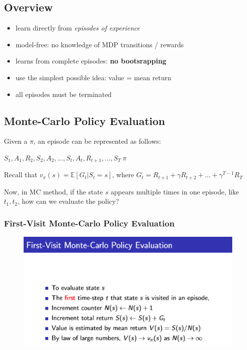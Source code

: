 \documentclass[12pt, a4paper]{paper}
\newcommand{\policy}[0]{$\pi$}
\newcommand{\statevalfunction}[0]{$v_{\pi}(s) = \mathbb{E} [G_{t} | S_{t} = s]$}
\newcommand{\statereturn}[0]{$G_{t} = R_{t+1} + \gamma R_{t+2} +...+ \gamma^{T-1} R_{T}$}
\begin{document}
\subsection{Overview}
\begin{itemize}
	\item learn directly from \textit{episodes of experience}
	\item model-free: no knowledge of MDP transitions / rewards
	\item learns from complete episodes: \textbf{no bootsrapping}
	\item use the simplest possible idea: value = mean return
	\item all episodes must be terminated
\end{itemize}

\subsection{Monte-Carlo Policy Evaluation}
Given a \policy, an episode can be represented as follows:

$S_{1}, A_{1}, R_{2}, S_{2}, A_{2}, ..., S_{t}, A_{t}, R_{t+1}, ..., S_{T} ~ \pi$

Recall that \statevalfunction, where \statereturn

Now, in MC method, if the state $s$ appears multiple times in one episode, like $t_{1}, t_{2}$, how can we evaluate the policy?
\subsubsection{First-Visit Monte-Carlo Policy Evaluation}
\begin{figure}[h]
	\begin{center}
		\includegraphics[width = \linewidth]{firstVisit.png}
	\end{center}
\end{figure}
\end{document}
